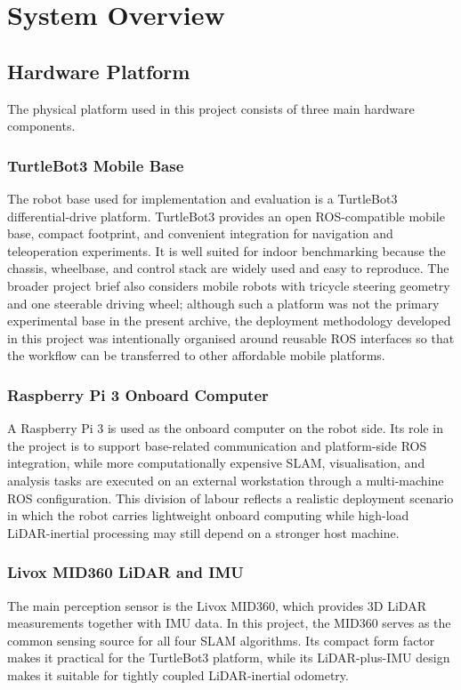 \documentclass[12pt,a4paper]{report}
\begin{document}
\chapter{System Overview}

\section{Hardware Platform}
The physical platform used in this project consists of three main hardware components.

\subsection{TurtleBot3 Mobile Base}
The robot base used for implementation and evaluation is a TurtleBot3 differential-drive platform. TurtleBot3 provides an open ROS-compatible mobile base, compact footprint, and convenient integration for navigation and teleoperation experiments. It is well suited for indoor benchmarking because the chassis, wheelbase, and control stack are widely used and easy to reproduce. The broader project brief also considers mobile robots with tricycle steering geometry and one steerable driving wheel; although such a platform was not the primary experimental base in the present archive, the deployment methodology developed in this project was intentionally organised around reusable ROS interfaces so that the workflow can be transferred to other affordable mobile platforms.

\subsection{Raspberry Pi 3 Onboard Computer}
A Raspberry Pi 3 is used as the onboard computer on the robot side. Its role in the project is to support base-related communication and platform-side ROS integration, while more computationally expensive SLAM, visualisation, and analysis tasks are executed on an external workstation through a multi-machine ROS configuration. This division of labour reflects a realistic deployment scenario in which the robot carries lightweight onboard computing while high-load LiDAR-inertial processing may still depend on a stronger host machine.

\subsection{Livox MID360 LiDAR and IMU}
The main perception sensor is the Livox MID360, which provides 3D LiDAR measurements together with IMU data. In this project, the MID360 serves as the common sensing source for all four SLAM algorithms. Its compact form factor makes it practical for the TurtleBot3 platform, while its LiDAR-plus-IMU design makes it suitable for tightly coupled LiDAR-inertial odometry.
\end{document}
